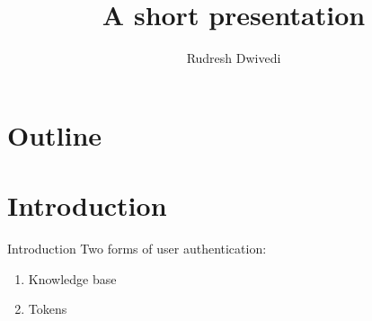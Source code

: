 \documentclass[xcolor=dvipsnames]{beamer}
\title[Summary thesis]{A short presentation}
\author[PhD]{Rudresh Dwivedi}
\begin{document}
    \begin{frame}
      \titlepage
    \end{frame}
        \section{Outline}
        \section[Introduction]{Introduction}
    \begin{frame}{Introduction}
        Two forms of user authentication:
        \begin{enumerate} 
            \item Knowledge base
            \item Tokens
        \end{enumerate} 
    \end{frame}
    
\end{document}

